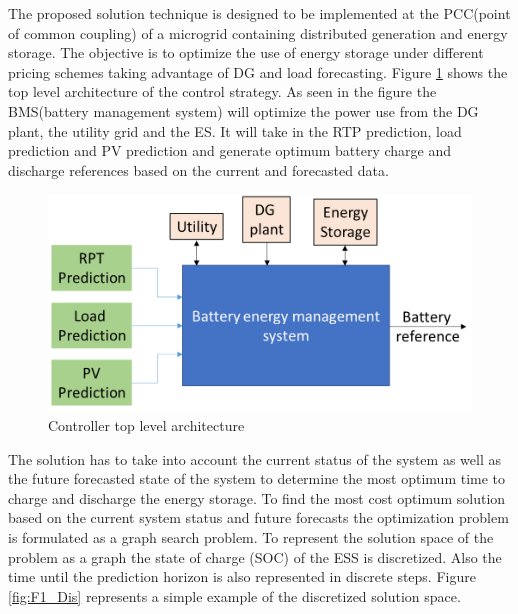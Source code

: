 The proposed solution technique is designed to be implemented at the PCC(point of common coupling) of a microgrid containing distributed generation and energy storage. The objective is to optimize the use of energy storage under different pricing schemes taking advantage of DG and load forecasting. Figure \ref{fig:F1_CA} shows the top level architecture of the control strategy. As seen in the figure the BMS(battery management system) will optimize the power use from the DG plant, the utility grid and the ES. It will take in the RTP prediction, load prediction and PV prediction and generate optimum battery charge and discharge references based on the current and forecasted data.

\begin{figure}[!ht]
    \centering
    \includegraphics[width = \linewidth]{figs/EMS_FIG.png}
    \caption{Controller top level architecture}
    \label{fig:F1_CA}
\end{figure}

The solution has to take into account the current status of the system as well as the future forecasted state of the system to determine the most optimum time to charge and discharge the energy storage. To find the most cost optimum solution based on the current system status and future forecasts the optimization problem is formulated as a graph search problem. To represent the solution space of the problem as a graph the state of charge (SOC) of the ESS is discretized. Also the time until the prediction horizon is also represented in discrete steps. Figure \ref{fig:F1_Dis} represents a simple example of the discretized solution space.

